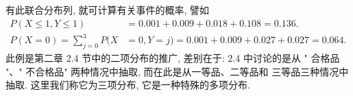  有此联合分布列, 就可计算有关事件的概率, 譬如
  \begin{align*}
    P(X \leq 1, Y \leq 1)&=0.001+0.009+0.018+0.108=0.136. \\
    P(X=0)=\sum_{j=0}^{3} P(X&=0, Y=j)=0.001+0.009+0.027+0.027=0.064.
  \end{align*}
  此例是第二章 2.4 节中的二项分布的推广, 差别在于: 2.4 中讨论的是从 " 合格品 "、" 不合格品" 两种情况中抽取, 而在此是从一等品、二等品和
  三等品三种情况中抽取. 这里我们称它为三项分布, 它是一种特殊的多项分布.